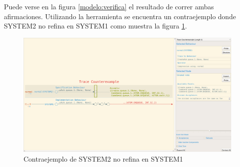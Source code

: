 Puede verse en la figura \ref{modelo:verifica} el resultado de correr ambas afirmaciones. Utilizando la herramienta se encuentra un contraejemplo donde  SYSTEM2 no refina en SYSTEM1 como muestra la figura \ref{modelo:contraejemplo}.
 

\begin{figure}[H]
\begin{center}
\includegraphics[width=15 cm]{img/contraejemplo.png}
\caption{Contraejemplo de SYSTEM2 no refina en SYSTEM1}\label{modelo:contraejemplo}
\end{center}
\end{figure}
 
